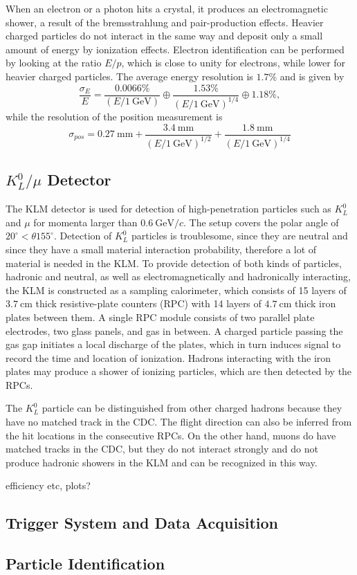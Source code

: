 \documentclass[headings=standardclasses,headings=big,oneside,a4paper,openany,12pt]{scrbook}
\newcommand {\e}[1]{\mathrm{~#1}}
\begin{document}
When an electron or a photon hits a crystal, it produces an electromagnetic shower, a result of the bremsstrahlung and pair-production effects. Heavier charged particles do not interact in the same way and deposit only a small amount of energy by ionization effects. Electron identification can be performed by looking at the ratio $E/p$, which is close to unity for electrons, while lower for heavier charged particles. The average energy resolution is $1.7\%$ and is given by
\begin{equation}
\frac{\sigma_E}{E} = \frac{0.0066\%}{\left(E/1\e{GeV}\right)}\oplus\frac{1.53\%}{\left( E/1\e{GeV}\right)^{1/4}}\oplus 1.18\%,
\end{equation}
while the resolution of the position measurement is
\begin{equation}
\sigma_{pos} = 0.27\e{mm}+\frac{3.4\e{mm}}{\left( E/1\e{GeV}\right)^{1/2}} + \frac{1.8\e{mm}}{\left( E/1\e{GeV}\right)^{1/4}}
\end{equation}


\subsection{$K_L^0/\mu$ Detector}
The KLM detector is used for detection of high-penetration particles such as $K_L^0$ and $\mu$ for momenta larger than $0.6\e{GeV}/c$. The setup covers the polar angle of $20^\circ < \theta 155^\circ$. Detection of $K_L^0$ particles is troublesome, since they are neutral and since they have a small material interaction probability, therefore a lot of material is needed in the KLM. To provide detection of both kinds of particles, hadronic and neutral, as well as electromagnetically and hadronically interacting, the KLM is constructed as a sampling calorimeter, which consists of 15 layers of $3.7\e{cm}$ thick resistive-plate counters (RPC) with 14 layers of $4.7\e{cm}$ thick iron plates between them. A single RPC module consists of two parallel plate electrodes, two glass panels, and gas in between. A charged particle passing the gas gap initiates a local discharge of the plates, which in turn induces signal to record the time and location of ionization. Hadrons interacting with the iron plates may produce a shower of ionizing particles, which are then detected by the RPCs. 

The $K_L^0$ particle can be distinguished from other charged hadrons because they have no matched track in the CDC. The flight direction can also be inferred from the hit locations in the consecutive RPCs. On the other hand, muons do have matched tracks in the CDC, but they do not interact strongly and do not produce hadronic showers in the KLM and can be recognized in this way.

efficiency etc, plots?


\subsection{Trigger System and Data Acquisition}
\subsection{Particle Identification}

\printbibliography
\end{document}
